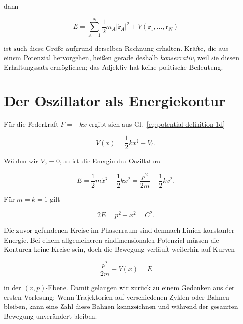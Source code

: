 dann

\begin{equation}
  E=\sum_{A=1}^{N}\frac12m_A\lvert\dot{\mathbf r}_A\rvert^2
    +V(\mathbf r_1,\ldots,\mathbf r_N)
  \label{eq:many-particle-energy}
\end{equation}

ist auch diese Größe aufgrund derselben Rechnung erhalten. Kräfte, die aus einem Potenzial hervorgehen, heißen gerade deshalb \emph{konservativ}, weil sie diesen Erhaltungssatz ermöglichen; das Adjektiv hat keine politische Bedeutung.

\section{Der Oszillator als Energiekontur}\enlargethispage{3\baselineskip}

Für die Federkraft \(F=-kx\) ergibt sich aus Gl.~\eqref{eq:potential-definition-1d}

\begin{equation}
  V(x)=\frac12kx^2+V_0.
  \label{eq:spring-potential}
\end{equation}

Wählen wir \(V_0=0\), so ist die Energie des Oszillators

\begin{equation}
  E=\frac12m\dot x^2+\frac12kx^2
   =\frac{p^2}{2m}+\frac12kx^2.
  \label{eq:oscillator-energy}
\end{equation}

Für \(m=k=1\) gilt

\begin{equation}
  2E=p^2+x^2=C^2.
  \label{eq:oscillator-energy-circle}
\end{equation}

Die zuvor gefundenen Kreise im Phasenraum sind demnach Linien konstanter Energie. Bei einem allgemeineren eindimensionalen Potenzial müssen die Konturen keine Kreise sein, doch die Bewegung verläuft weiterhin auf Kurven

\begin{equation}
  \frac{p^2}{2m}+V(x)=E
  \label{eq:general-energy-contour}
\end{equation}

in der \((x,p)\)-Ebene. Damit gelangen wir zurück zu einem Gedanken aus der ersten Vorlesung: Wenn Trajektorien auf verschiedenen Zyklen oder Bahnen bleiben, kann eine Zahl diese Bahnen kennzeichnen und während der gesamten Bewegung unverändert bleiben.

